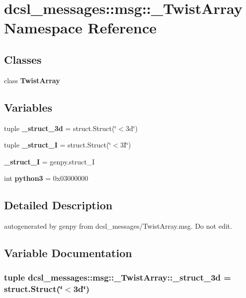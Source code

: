 \section{dcsl\-\_\-messages\-:\-:msg\-:\-:\-\_\-\-Twist\-Array \-Namespace \-Reference}
\label{namespacedcsl__messages_1_1msg_1_1__TwistArray}
\subsection*{\-Classes}
\begin{DoxyCompactItemize}
\item 
class {\bf \-Twist\-Array}
\end{DoxyCompactItemize}
\subsection*{\-Variables}
\begin{DoxyCompactItemize}
\item 
tuple {\bf \-\_\-struct\-\_\-3d} = struct.\-Struct(\char`\"{}$<$3d\char`\"{})
\item 
tuple {\bf \-\_\-struct\-\_\-I} = struct.\-Struct(\char`\"{}$<$3\-I\char`\"{})
\item 
{\bf \-\_\-struct\-\_\-\-I} = genpy.\-struct\-\_\-\-I
\item 
int {\bf python3} = 0x03000000
\end{DoxyCompactItemize}


\subsection{\-Detailed \-Description}
\begin{DoxyVerb}autogenerated by genpy from dcsl_messages/TwistArray.msg. Do not edit.\end{DoxyVerb}
 

\subsection{\-Variable \-Documentation}
\subsubsection[{\-\_\-struct\-\_\-3d}]{\setlength{\rightskip}{0pt plus 5cm}tuple {\bf dcsl\-\_\-messages\-::msg\-::\-\_\-\-Twist\-Array\-::\-\_\-struct\-\_\-3d} = struct.\-Struct(\char`\"{}$<$3d\char`\"{})}\label{namespacedcsl__messages_1_1msg_1_1__TwistArray_a80971b2cf8cb24c8f4f464c040c1a380}


